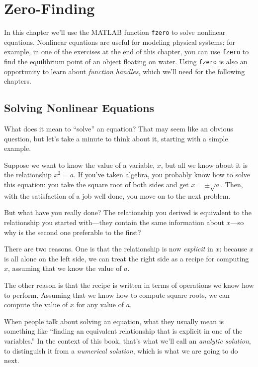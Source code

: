 \chapter{Zero-Finding}
\label{fzero}


In this chapter we'll use the MATLAB function \lstinline{fzero} to solve nonlinear equations.
Nonlinear equations are useful for modeling physical systems; for example, in one of
the exercises at the end of this chapter, you can use \lstinline{fzero} to find the equilibrium point of an object floating on water.
Using \lstinline{fzero} is also an opportunity to learn about \emph{function handles}, which we'll need for the following chapters.

\section{Solving Nonlinear Equations}


What does it mean to ``solve'' an equation?  That may seem like an
obvious question, but let's take a minute to think about it,
starting with a simple \mbox{example}.

Suppose we want to know the
value of a variable, $x$, but all we know about it is the relationship
$x^2 = a$. If you've taken algebra, you probably  know how to solve this
equation: you take the square root of both sides and get
$x = \pm \sqrt{a}$.  Then, with the satisfaction of a job well done,
you move on to the next problem.


But what have you really done?  The relationship you derived is
equivalent to the relationship you started with---they contain the
same information about $x$---so why is the second one preferable
to the first?

There are two reasons.  One is that the relationship is now \emph{explicit} in $x$: because $x$ is all alone on the left side, we can treat the right side as a recipe for computing $x$, assuming that we know the value of $a$.


The other reason is that the recipe is written in terms of operations
we know how to perform.  Assuming that we know how to compute square
roots, we can compute the value of $x$ for any value of $a$.

When people talk about solving an equation, what they usually mean
is something like ``finding an equivalent relationship that is
explicit in one of the variables.''  In the context of this book,
that's what we'll call an \emph{analytic \mbox{solution}}, to distinguish
it from a \emph{numerical solution}, which is what we are going to
do next.

